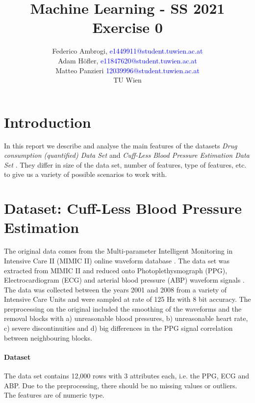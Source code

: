 \documentclass{article}
\begin{document}
\title{ Machine Learning - SS 2021 \\ Exercise 0 }


	\author{Federico Ambrogi, \textcolor{blue} {e1449911@student.tuwien.ac.at } \\
	Adam Höfler, \textcolor{blue} {e11847620@student.tuwien.ac.at } \\
	Matteo Panzieri \textcolor{blue}{12039996@student.tuwien.ac.at } \\
    TU Wien }






\maketitle
\setcounter{tocdepth}{2}
\tableofcontents

\section*{Introduction}
In this report we describe and analyse the main features of the datasets \textit{Drug consumption (quantified) Data Set
}\cite{DrugConsumption} and \textit{Cuff-Less Blood Pressure Estimation Data Set} \cite{BloodPressure}.
They differ in size of the data set, number of features, type of features, etc. to give us a variety of possible scenarios to work with.

\section{Dataset: Cuff-Less Blood Pressure Estimation}
The original data comes from the Multi-parameter Intelligent Monitoring in Intensive Care II (MIMIC II) online waveform database \cite{BloodPressureDatabase}\cite{Goldberger2000PhysioBankPA}. The data set was extracted from MIMIC II and reduced onto Photoplethysmograph (PPG), Electrocardiogram (ECG) and arterial blood pressure (ABP) waveform signals \cite{Kachuee2015CufflessHC}. The data was collected between the years 2001 and 2008 from a variety of Intensive Care Units and were sampled at rate of 125 Hz with 8 bit accuracy. The preprocessing on the original included the smoothing of the waveforms and the removal blocks with a) unreasonable blood pressures, b) unreasonable heart rate, c) severe discontinuities and d) big differences in the PPG signal correlation between neighbouring blocks.

\paragraph{Dataset}
\noindent The data set contains 12,000 rows with 3 attributes each, i.e. the PPG, ECG and ABP. Due to the preprocessing, there should be no missing values or outliers. The features are of numeric type.
\end{document}
